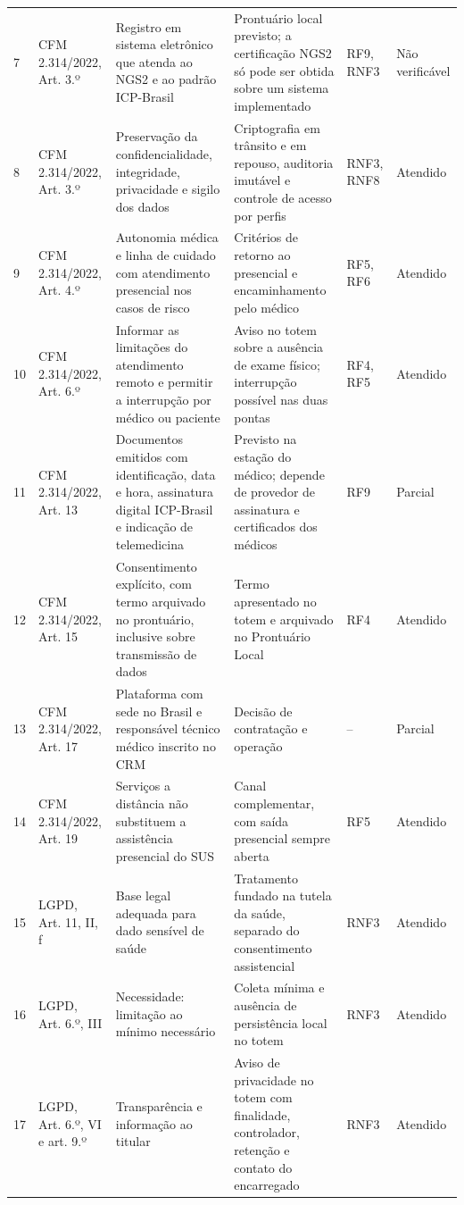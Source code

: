 {\begin{longtable}{L{0.5cm} L{1.9cm} L{3.6cm} L{4.3cm} L{1.3cm} L{1.6cm}}
7 & CFM 2.314/2022, Art. 3.º & Registro em sistema eletrônico que atenda ao NGS2 e ao padrão ICP-Brasil & Prontuário local previsto; a certificação NGS2 só pode ser obtida sobre um sistema implementado & RF9, RNF3 & Não verificável \\
8 & CFM 2.314/2022, Art. 3.º & Preservação da confidencialidade, integridade, privacidade e sigilo dos dados & Criptografia em trânsito e em repouso, auditoria imutável e controle de acesso por perfis & RNF3, RNF8 & Atendido \\
9 & CFM 2.314/2022, Art. 4.º & Autonomia médica e linha de cuidado com atendimento presencial nos casos de risco & Critérios de retorno ao presencial e encaminhamento pelo médico & RF5, RF6 & Atendido \\
10 & CFM 2.314/2022, Art. 6.º & Informar as limitações do atendimento remoto e permitir a interrupção por médico ou paciente & Aviso no totem sobre a ausência de exame físico; interrupção possível nas duas pontas & RF4, RF5 & Atendido \\
11 & CFM 2.314/2022, Art. 13 & Documentos emitidos com identificação, data e hora, assinatura digital ICP-Brasil e indicação de telemedicina & Previsto na estação do médico; depende de provedor de assinatura e certificados dos médicos & RF9 & Parcial \\
12 & CFM 2.314/2022, Art. 15 & Consentimento explícito, com termo arquivado no prontuário, inclusive sobre transmissão de dados & Termo apresentado no totem e arquivado no Prontuário Local & RF4 & Atendido \\
13 & CFM 2.314/2022, Art. 17 & Plataforma com sede no Brasil e responsável técnico médico inscrito no CRM & Decisão de contratação e operação & -- & Parcial \\
14 & CFM 2.314/2022, Art. 19 & Serviços a distância não substituem a assistência presencial do SUS & Canal complementar, com saída presencial sempre aberta & RF5 & Atendido \\
15 & LGPD, Art. 11, II, f & Base legal adequada para dado sensível de saúde & Tratamento fundado na tutela da saúde, separado do consentimento assistencial & RNF3 & Atendido \\
16 & LGPD, Art. 6.º, III & Necessidade: limitação ao mínimo necessário & Coleta mínima e ausência de persistência local no totem & RNF3 & Atendido \\
17 & LGPD, Art. 6.º, VI e art. 9.º & Transparência e informação ao titular & Aviso de privacidade no totem com finalidade, controlador, retenção e contato do encarregado & RNF3 & Atendido \\

\end{longtable}}
